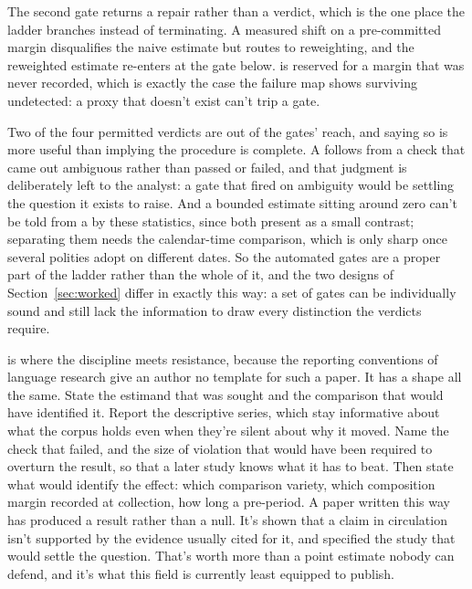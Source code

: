 The second gate returns a repair rather than a verdict, which is the one place the ladder branches instead of terminating. A measured shift on a pre-committed margin disqualifies the naive estimate but routes to reweighting, and the reweighted estimate re-enters at the gate below.  is reserved for a margin that was never recorded, which is exactly the case the failure map shows surviving undetected: a proxy that doesn't exist can't trip a gate.

Two of the four permitted verdicts are out of the gates' reach, and saying so is more useful than implying the procedure is complete. A  follows from a check that came out ambiguous rather than passed or failed, and that judgment is deliberately left to the analyst: a gate that fired on ambiguity would be settling the question it exists to raise. And a bounded estimate sitting around zero can't be told from a  by these statistics, since both present as a small contrast; separating them needs the calendar-time comparison, which is only sharp once several polities adopt on different dates. So the automated gates are a proper part of the ladder rather than the whole of it, and the two designs of Section~\ref{sec:worked} differ in exactly this way: a set of gates can be individually sound and still lack the information to draw every distinction the verdicts require.

 is where the discipline meets resistance, because the reporting conventions of language research give an author no template for such a paper. It has a shape all the same. State the estimand that was sought and the comparison that would have identified it. Report the descriptive series, which stay informative about what the corpus holds even when they're silent about why it moved. Name the check that failed, and the size of violation that would have been required to overturn the result, so that a later study knows what it has to beat. Then state what would identify the effect: which comparison variety, which composition margin recorded at collection, how long a pre-period. A paper written this way has produced a result rather than a null. It's shown that a claim in circulation isn't supported by the evidence usually cited for it, and specified the study that would settle the question. That's worth more than a point estimate nobody can defend, and it's what this field is currently least equipped to publish.

